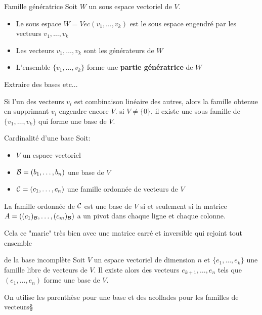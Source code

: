 \begin{parag}{Famille génératrice}
    Soit $W$ un sous espace vectoriel de $V$.
    \begin{itemize}
        \item Le sous espace $W = Vec(v_1, \dots, v_k)$ est le sous espace engendré par les vecteurs $v_1, \dots, v_k$
        \item Les vecteurs $v_1, \dots, v_k$ sont les générateurs de $W$
        \item L'ensemble $\{v_1, \dots, v_k\}$ forme une \textbf{partie génératrice} de $W$
    \end{itemize}
    \begin{subparag}{Extraire des bases etc...}
        \begin{theoreme}
            Si l'un des vecteurs $v_i$ est combinaison linéaire des autres, alors la famille obtenue en supprimant $v_i$ engendre encore $V$.
            si $V \neq \{0\}$, il existe une sous famille de $\{v_1, \dots, v_k\}$ qui forme une base de $V$.
        \end{theoreme}
    \end{subparag}
    \begin{subparag}{Cardinalité d'une base}
    Soit:
    \begin{itemize}
        \item $V$ un espace vectoriel
        \item $\mathcal{B} = (b_1, \dots, b_n)$ une base de $V$
        \item $\mathcal{C} = (c_1, \dots, c_n)$ une famille ordonnée de vecteurs de $V$
    \end{itemize}
    \begin{theoreme}
        La famille ordonnée de $\mathcal{C}$ est une base de $V$ si et seulement si la matrice $A = ((c_1)_{\mathcal{B}}, \dots, (c_m)_{\mathcal{B}})$ a un pivot dans chaque ligne et chaque colonne.
    \end{theoreme}
    \begin{framedremark}
        Cela ce "marie" très bien avec une matrice carré et inversible qui rejoint tout ensemble
    \end{framedremark}
        
    \end{subparag}
    \begin{theoreme}{de la base incomplète}
        Soit $V$ un espace vectoriel de dimension $n$ et $\{e_1, \dots, e_k\}$ une famille libre de vecteurs de $V$. Il existe alors des vecteurs $e_{k+1}, \dots, e_n$ tels que $(e_1, \dots, e_n)$ forme une base de $V$.
    \end{theoreme}
    \begin{truc}
        On utilise les parenthèse pour une base et des acollades pour les familles de vecteurs§
    \end{truc}
\end{parag}
